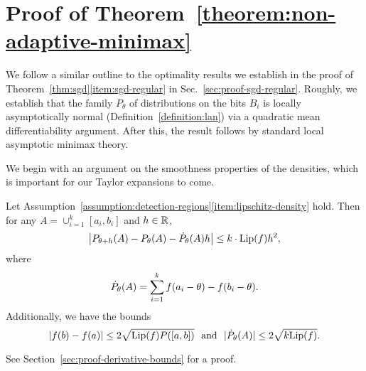 
\section{Proof of Theorem~\ref{theorem:non-adaptive-minimax}}
\label{sec:proof-non-adaptive-minimax}

We follow a similar outline to the optimality results we establish
in the proof of Theorem~\ref{thm:sgd}\eqref{item:sgd-regular} in
Sec.~\ref{sec:proof-sgd-regular}.
Roughly, we establish that the family $P_\theta$ of distributions
on the bits $B_i$ is locally asymptotically normal
(Definition~\ref{definition:lan}) via a quadratic
mean differentiability argument. After this, the result
follows by standard local asymptotic minimax theory.

We begin with an argument on the smoothness properties of the densities,
which is important for our Taylor expansions to come.
\begin{lemma}
  \label{lemma:derivative-bounds}
  Let Assumption~\ref{assumption:detection-regions}\eqref{item:lipschitz-density} hold. Then for any $A = \cup_{i = 1}^k
  [a_i, b_i]$ and $h \in \mathbb{R}$,
  \begin{equation*}
    \left|P_{\theta + h}(A) - P_\theta(A) - \dot{P}_\theta(A) h \right| \leq 
    k \cdot {\rm \textup{Lip}}(f) h^2,
  \end{equation*}
  where
  \begin{equation}
    \dot{P}_\theta(A) = \sum_{i = 1}^k f(a_i - \theta) - f(b_i - \theta).
    \label{eqn:expansion-dPtheta}
  \end{equation}
  Additionally, we have the bounds
  \begin{equation}
    \label{eqn:bound-density-diffs}
    |f(b) - f(a)| \le 2 \sqrt{{\rm \textup{Lip}}(f) P([a, b])}
    ~~ \mbox{and} ~~
    |\dot{P}_\theta(A)| \le 2 \sqrt{k {\rm \textup{Lip}}(f)}.
  \end{equation}
\end{lemma}
\noindent
See Section~\ref{sec:proof-derivative-bounds} for a proof.

